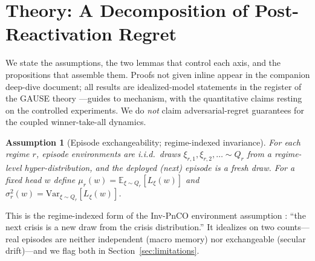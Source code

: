 \documentclass{article}
\newtheorem{assumption}{Assumption}
\newcommand{\E}{\mathbb{E}}
\newcommand{\Var}{\mathrm{Var}}
\begin{document}
\section{Theory: A Decomposition of Post-Reactivation Regret}
\label{sec:theory}

We state the assumptions, the two lemmas that control each axis, and the
propositions that assemble them. Proofs not given inline appear in the
companion deep-dive document; all results are idealized-model statements in
the register of the GAUSE theory \citep{li2026gause}---guides to mechanism,
with the quantitative claims resting on the controlled experiments. We do
\emph{not} claim adversarial-regret guarantees for the coupled
winner-take-all dynamics.

\begin{assumption}[Episode exchangeability; regime-indexed invariance]
\label{ass:hyper}
For each regime $r$, episode environments are i.i.d.\ draws
$\xi_{r,1}, \xi_{r,2}, \dots \sim Q_r$ from a regime-level
hyper-distribution, and the deployed (next) episode is a fresh draw. For a
fixed head $w$ define $\mu_r(w) = \E_{\xi \sim Q_r}[L_\xi(w)]$ and
$\sigma_r^2(w) = \Var_{\xi \sim Q_r}[L_\xi(w)]$.
\end{assumption}

This is the regime-indexed form of the Inv-PnCO environment assumption
\citep{yan2026invpnco}: ``the next crisis is a new draw from the crisis
distribution.'' It idealizes on two counts---real episodes are neither
independent (macro memory) nor exchangeable (secular drift)---and we flag
both in Section~\ref{sec:limitations}.
\end{document}
